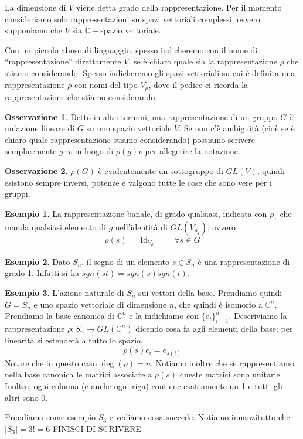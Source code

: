 \documentclass[11pt]{article}
\theoremstyle{plain}
\theoremstyle{definition}
\newtheorem{exmp}{Esempio}[section]
\newtheorem*{rem}{Osservazione}
\theoremstyle{remark}
\newcommand{\C}{\mathbb{C}}
\DeclareMathOperator{\Id}{Id}
\begin{document}
La dimensione di $V$ viene detta grado della rappresentazione.
Per il momento consideriamo solo rappresentazioni su spazi vettoriali complessi, ovvero supponiamo che $V$ sia $\C-$spazio vettoriale.

Con un piccolo abuso di linguaggio, spesso indicheremo con il nome di ``rappresentazione'' direttamente $V$, se è chiaro quale sia 
la rappresentazione $\rho$ che stiamo considerando. Spesso indicheremo gli spazi vettoriali
su cui è definita una rappresentazione $\rho$ con nomi del tipo $V_\rho$, dove il pedice ci ricorda la rappresentazione che stiamo considerando.

\begin{rem}
Detto in altri termini, una rappresentazione di un gruppo $G$ è un'azione lineare di $G$ su uno spazio vettoriale $V$.
Se non c'è ambiguità (cioè se è chiaro quale rappresentazione stiamo considerando)
possiamo scrivere semplicemente $g\cdot v$ in luogo di $\rho(g)v$ per allegerire la notazione.
\end{rem}

\begin{rem}
$\rho(G)$ è evidentemente un sottogruppo di $GL(V)$, quindi esistono sempre inversi, potenze e valgono tutte le cose che sono vere per i gruppi.
\end{rem}


\begin{exmp}
   La rappresentazione banale, di grado qualsiasi, indicata con $\rho_1$ che manda qualsiasi elemento di $g$ nell'identità di $GL(V_{\rho_1})$, ovvero
	\[ \rho(s ) = \Id_{V_{\rho_1}} \qquad \forall s \in G\]
\end{exmp}
\begin{exmp}
   Dato $S_n$, il segno di un elemento $s\in S_n$ è una rappresentazione di grado 1. Infatti si ha $sgn(st) = sgn(s) sgn(t)$.
\end{exmp}
\begin{exmp}
   L'azione naturale di $S_n$ sui vettori della base. Prendiamo quindi $G = S_n$ e uno spazio vettoriale di dimensione $n$, che quindi è isomorfo a $\C^n$. Prendiamo la base canonica di $\C^n$ e la indichiamo con $\{e_i\}_{i=1}^n$. Descriviamo la rappresentazione $\rho: S_n \to GL(\C^n)$ dicendo cosa fa agli elementi della base: per linearità si estenderà a tutto lo spazio.
	\[ \rho(s) e_i = e_{s(i)}\]
	Notare che in questo caso $\deg(\rho) = n$. Notiamo inoltre che se rappresentiamo nella base canonica le matrici associate a $\rho(s)$ queste matrici sono unitarie. Inoltre, ogni colonna (e anche ogni riga) contiene esattamente un 1 e tutti gli altri sono 0.
	
	Prendiamo come esempio $S_3$ e vediamo cosa succede. Notiamo innanzitutto che $ |S_3| = 3! = 6$
	FINISCI DI SCRIVERE
\end{exmp}
\end{document}
